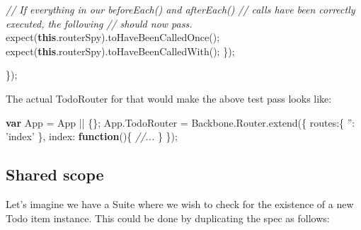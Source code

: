\documentclass[9pt]{book}
\newenvironment{Shaded}{}{}
\newcommand{\KeywordTok}[1]{\textcolor[rgb]{0.00,0.44,0.13}{\textbf{{#1}}}}
\newcommand{\DataTypeTok}[1]{\textcolor[rgb]{0.56,0.13,0.00}{{#1}}}
\newcommand{\StringTok}[1]{\textcolor[rgb]{0.25,0.44,0.63}{{#1}}}
\newcommand{\CommentTok}[1]{\textcolor[rgb]{0.38,0.63,0.69}{\textit{{#1}}}}
\newcommand{\OtherTok}[1]{\textcolor[rgb]{0.00,0.44,0.13}{{#1}}}
\newcommand{\FunctionTok}[1]{\textcolor[rgb]{0.02,0.16,0.49}{{#1}}}
\newcommand{\NormalTok}[1]{{#1}}
\begin{document}
\begin{Shaded}
\begin{Highlighting}[]
        \CommentTok{// If everything in our beforeEach() and afterEach()}
        \CommentTok{// calls have been correctly executed, the following}
        \CommentTok{// should now pass.}
        \FunctionTok{expect}\NormalTok{(}\KeywordTok{this}\NormalTok{.}\FunctionTok{routerSpy}\NormalTok{).}\FunctionTok{toHaveBeenCalledOnce}\NormalTok{();}
        \FunctionTok{expect}\NormalTok{(}\KeywordTok{this}\NormalTok{.}\FunctionTok{routerSpy}\NormalTok{).}\FunctionTok{toHaveBeenCalledWith}\NormalTok{();}
   \NormalTok{\});}

\NormalTok{\});}
\end{Highlighting}
\end{Shaded}

The actual TodoRouter for that would make the above test pass looks
like:

\begin{Shaded}
\begin{Highlighting}[]
\KeywordTok{var} \NormalTok{App = App || \{\};}
\OtherTok{App}\NormalTok{.}\FunctionTok{TodoRouter} \NormalTok{= }\OtherTok{Backbone}\NormalTok{.}\OtherTok{Router}\NormalTok{.}\FunctionTok{extend}\NormalTok{(\{}
    \DataTypeTok{routes}\NormalTok{:\{}
        \StringTok{''}\NormalTok{: }\StringTok{'index'}
    \NormalTok{\},}
    \DataTypeTok{index}\NormalTok{: }\KeywordTok{function}\NormalTok{()\{}
        \CommentTok{//...}
    \NormalTok{\}}
\NormalTok{\});}
\end{Highlighting}
\end{Shaded}

\subsection{Shared scope}\label{shared-scope}

Let's imagine we have a Suite where we wish to check for the existence
of a new Todo item instance. This could be done by duplicating the spec
as follows:
\end{document}
